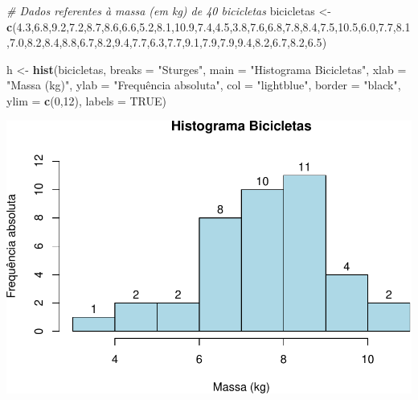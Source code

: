 \documentclass[
]{book}
\newenvironment{Shaded}{\begin{snugshade}}{\end{snugshade}}
\newcommand{\AttributeTok}[1]{\textcolor[rgb]{0.13,0.29,0.53}{#1}}
\newcommand{\CommentTok}[1]{\textcolor[rgb]{0.56,0.35,0.01}{\textit{#1}}}
\newcommand{\ConstantTok}[1]{\textcolor[rgb]{0.56,0.35,0.01}{#1}}
\newcommand{\DecValTok}[1]{\textcolor[rgb]{0.00,0.00,0.81}{#1}}
\newcommand{\FloatTok}[1]{\textcolor[rgb]{0.00,0.00,0.81}{#1}}
\newcommand{\FunctionTok}[1]{\textcolor[rgb]{0.13,0.29,0.53}{\textbf{#1}}}
\newcommand{\NormalTok}[1]{#1}
\newcommand{\OtherTok}[1]{\textcolor[rgb]{0.56,0.35,0.01}{#1}}
\newcommand{\StringTok}[1]{\textcolor[rgb]{0.31,0.60,0.02}{#1}}
\begin{document}
\begin{Shaded}
\begin{Highlighting}[]
\CommentTok{\# Dados referentes à massa (em kg) de 40 bicicletas}
\NormalTok{bicicletas }\OtherTok{\textless{}{-}} \FunctionTok{c}\NormalTok{(}\FloatTok{4.3}\NormalTok{,}\FloatTok{6.8}\NormalTok{,}\FloatTok{9.2}\NormalTok{,}\FloatTok{7.2}\NormalTok{,}\FloatTok{8.7}\NormalTok{,}\FloatTok{8.6}\NormalTok{,}\FloatTok{6.6}\NormalTok{,}\FloatTok{5.2}\NormalTok{,}\FloatTok{8.1}\NormalTok{,}\FloatTok{10.9}\NormalTok{,}\FloatTok{7.4}\NormalTok{,}\FloatTok{4.5}\NormalTok{,}\FloatTok{3.8}\NormalTok{,}\FloatTok{7.6}\NormalTok{,}\FloatTok{6.8}\NormalTok{,}\FloatTok{7.8}\NormalTok{,}\FloatTok{8.4}\NormalTok{,}\FloatTok{7.5}\NormalTok{,}\FloatTok{10.5}\NormalTok{,}\FloatTok{6.0}\NormalTok{,}\FloatTok{7.7}\NormalTok{,}\FloatTok{8.1}\NormalTok{,}\FloatTok{7.0}\NormalTok{,}\FloatTok{8.2}\NormalTok{,}\FloatTok{8.4}\NormalTok{,}\FloatTok{8.8}\NormalTok{,}\FloatTok{6.7}\NormalTok{,}\FloatTok{8.2}\NormalTok{,}\FloatTok{9.4}\NormalTok{,}\FloatTok{7.7}\NormalTok{,}\FloatTok{6.3}\NormalTok{,}\FloatTok{7.7}\NormalTok{,}\FloatTok{9.1}\NormalTok{,}\FloatTok{7.9}\NormalTok{,}\FloatTok{7.9}\NormalTok{,}\FloatTok{9.4}\NormalTok{,}\FloatTok{8.2}\NormalTok{,}\FloatTok{6.7}\NormalTok{,}\FloatTok{8.2}\NormalTok{,}\FloatTok{6.5}\NormalTok{)}
  
\NormalTok{h }\OtherTok{\textless{}{-}} \FunctionTok{hist}\NormalTok{(bicicletas,}
          \AttributeTok{breaks =} \StringTok{"Sturges"}\NormalTok{,}
          \AttributeTok{main =} \StringTok{"Histograma Bicicletas"}\NormalTok{,}
          \AttributeTok{xlab =} \StringTok{"Massa (kg)"}\NormalTok{,}
          \AttributeTok{ylab =} \StringTok{"Frequência absoluta"}\NormalTok{,}
          \AttributeTok{col =} \StringTok{"lightblue"}\NormalTok{,}
          \AttributeTok{border =} \StringTok{"black"}\NormalTok{,}
          \AttributeTok{ylim =} \FunctionTok{c}\NormalTok{(}\DecValTok{0}\NormalTok{,}\DecValTok{12}\NormalTok{),}
          \AttributeTok{labels =} \ConstantTok{TRUE}\NormalTok{)}
\end{Highlighting}
\end{Shaded}

\includegraphics{introR_files/figure-latex/unnamed-chunk-169-1.pdf}
\end{document}
